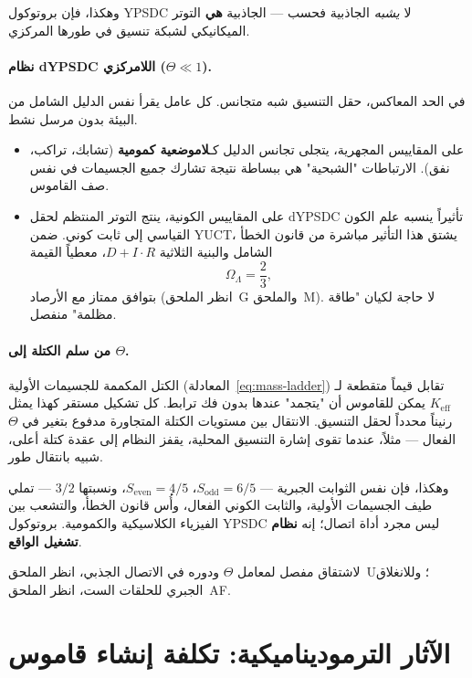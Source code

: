 \documentclass[12pt,a4paper]{article}
\theoremstyle{remark}
\begin{document}
	وهكذا، فإن بروتوكول YPSDC لا \emph{يشبه} الجاذبية فحسب — الجاذبية \textbf{هي} التوتر الميكانيكي لشبكة تنسيق في طورها المركزي.
	
	\paragraph{نظام dYPSDC اللامركزي (\(\Theta \ll 1\)).}
	في الحد المعاكس، حقل التنسيق شبه متجانس. كل عامل يقرأ نفس الدليل الشامل من البيئة بدون مرسل نشط.
	\begin{itemize}
		\item على المقاييس المجهرية، يتجلى تجانس الدليل كـ\textbf{لاموضعية كمومية} (تشابك، تراكب، نفق). الارتباطات "الشبحية" هي ببساطة نتيجة تشارك جميع الجسيمات في نفس صف القاموس.
		\item على المقاييس الكونية، ينتج التوتر المنتظم لحقل dYPSDC تأثيراً ينسبه علم الكون القياسي إلى ثابت كوني. ضمن YUCT، يشتق هذا التأثير مباشرة من قانون الخطأ الشامل والبنية الثلاثية \(D+I\!\cdot\!R\)، معطياً القيمة
		\[
		\Omega_{\Lambda} = \frac{2}{3},
		\]
		بتوافق ممتاز مع الأرصاد (انظر الملحق~G والملحق~M). لا حاجة لكيان "طاقة مظلمة" منفصل.
	\end{itemize}
	
	\paragraph{من سلم الكتلة إلى \(\Theta\).}
	الكتل المكممة للجسيمات الأولية (المعادلة~\ref{eq:mass-ladder}) تقابل قيماً متقطعة لـ \(K_{\mathrm{eff}}\) يمكن للقاموس أن "يتجمد" عندها بدون فك ترابط. كل تشكيل مستقر كهذا يمثل رنيناً محدداً لحقل التنسيق. الانتقال بين مستويات الكتلة المتجاورة مدفوع بتغير في \(\Theta\) الفعال — مثلاً، عندما تقوى إشارة التنسيق المحلية، يقفز النظام إلى عقدة كتلة أعلى، شبيه بانتقال طور.
	
	وهكذا، فإن نفس الثوابت الجبرية — \(S_{\mathrm{odd}} = 6/5\)، \(S_{\mathrm{even}} = 4/5\)، ونسبتها \(3/2\) — تملي طيف الجسيمات الأولية، والثابت الكوني الفعال، وأُس قانون الخطأ، والتشعب بين الفيزياء الكلاسيكية والكمومية. بروتوكول YPSDC ليس مجرد أداة اتصال؛ إنه \textbf{نظام تشغيل الواقع}.
	
	لاشتقاق مفصل لمعامل \(\Theta\) ودوره في الاتصال الجذبي، انظر الملحق~U؛ وللانغلاق الجبري للحلقات الست، انظر الملحق~AF.
	
	\section{الآثار الترموديناميكية: تكلفة إنشاء قاموس}
	\label{sec:thermo}
	
\end{document}
